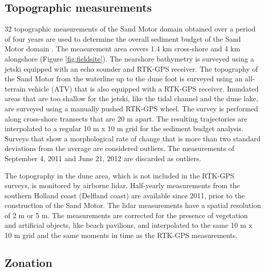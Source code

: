 \subsection{Topographic measurements}

32 topographic measurements of the Sand Motor domain obtained over a
period of four years are used to determine the overall sediment budget
of the Sand Motor domain \citep{deSchipper2016}. The measurement area
covers 1.4 km cross-shore and 4 km alongshore (Figure
\ref{fig:fieldsite}). The nearshore bathymetry is surveyed using a
jetski equipped with an echo sounder and RTK-GPS receiver. The
topography of the Sand Motor from the waterline up to the dune foot is
surveyed using an all-terrain vehicle (ATV) that is also equipped with
a RTK-GPS receiver. Inundated areas that are too shallow for the
jetski, like the tidal channel and the dune lake, are surveyed using a
manually pushed RTK-GPS wheel. The survey is performed along
cross-shore transects that are 20 m apart. The resulting trajectories
are interpolated to a regular 10 m x 10 m grid for the sediment budget
analysis. Surveys that show a morphological rate of change that is
more than two standard deviations from the average are considered
outliers. The measurements of September 4, 2011 and June 21, 2012 are
discarded as outliers.

The topography in the dune area, which is not included in the RTK-GPS
surveys, is monitored by airborne lidar. Half-yearly measurements from
the southern Holland coast (Delfland coast) are available since 2011,
prior to the construction of the Sand Motor. The lidar measurements
have a spatial resolution of 2 m or 5 m. The measurements are
corrected for the presence of vegetation and artificial objects, like
beach pavilions, and interpolated to the same 10 m x 10 m grid and the
same moments in time as the RTK-GPS measurements.

\subsection{Zonation}
\label{sec:zonation}

